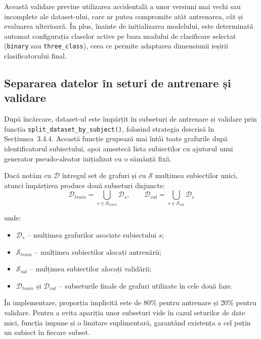 \documentclass[12pt,a4paper]{report}
\theoremstyle{definition}
\theoremstyle{remark}
\begin{document}
Această validare previne utilizarea accidentală a unor versiuni mai vechi sau incomplete ale dataset-ului, care ar putea compromite atât antrenarea, cât și evaluarea ulterioară. În plus, înainte de inițializarea modelului, este determinată automat configurația claselor active pe baza modului de clasificare selectat (\texttt{binary} sau \texttt{three\_class}), ceea ce permite adaptarea dimensiunii ieșirii clasificatorului final.

\subsection{Separarea datelor în seturi de antrenare și validare}

După încărcare, dataset-ul este împărțit în subseturi de antrenare și validare prin funcția \texttt{split\_dataset\_by\_subject()}, folosind strategia descrisă în Secțiunea~3.4.4. Această funcție grupează mai întâi toate grafurile după identificatorul subiectului, apoi amestecă lista subiectilor cu ajutorul unui generator pseudo-aleator inițializat cu o sămânță fixă.

Dacă notăm cu $\mathcal{D}$ întregul set de grafuri și cu $\mathcal{S}$ mulțimea subiectilor unici, atunci împărțirea produce două subseturi disjuncte:
\begin{equation}
    \mathcal{D}_{train} = \bigcup_{s \in \mathcal{S}_{train}} \mathcal{D}_s,
    \qquad
    \mathcal{D}_{val} = \bigcup_{s \in \mathcal{S}_{val}} \mathcal{D}_s
    \label{eq:dataset_split_graphs}
\end{equation}

\noindent unde:
\begin{itemize}
    \item $\mathcal{D}_s$ -- mulțimea grafurilor asociate subiectului $s$;
    \item $\mathcal{S}_{train}$ -- mulțimea subiectilor alocați antrenării;
    \item $\mathcal{S}_{val}$ -- mulțimea subiectilor alocați validării;
    \item $\mathcal{D}_{train}$ și $\mathcal{D}_{val}$ -- subseturile finale de grafuri utilizate în cele două faze.
\end{itemize}

În implementare, proporția implicită este de 80\% pentru antrenare și 20\% pentru validare. Pentru a evita apariția unor subseturi vide în cazul seturilor de date mici, funcția impune și o limitare suplimentară, garantând existența a cel puțin un subiect în fiecare subset.
\end{document}
